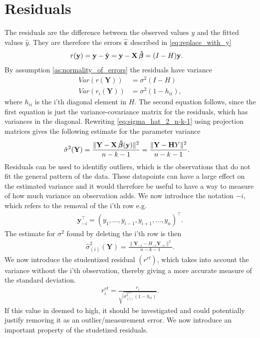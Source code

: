 \section{Residuals}\label{subsec:residuals}

The residuals are the difference between the observed values $y$ and the fitted values $\hat{y}$. They are therefore the errors $\boldsymbol{\hat{\varepsilon}}$ described in \eqref{eq:replace_with_y}
\begin{align*}
    r(\textbf{y}) &= \textbf{y} - \hat{\textbf{y}} = \textbf{y} - \textbf{X} \operatorname{\boldsymbol{\hat{\beta}}} = (I - H) \textbf{y}.
\end{align*}
By assumption \ref{as:normality_of_errors} the residuals have variance
\begin{align*}
    Var(r(\textbf{Y})) &= \sigma^2 (I - H) \\
    Var(r_i(\textbf{Y})) &= \sigma^2(1 - h_{ii}),
\end{align*}
where $h_{ii}$ is the i'th diagonal element in $H$. The second equation follows, since the first equation is just the variance-covariance matrix for the residuals, which has variances in the diagonal.
Rewriting \eqref{eq:sigma_hat_2_n-k-1} using projection matrices gives the following estimate for the parameter variance
\begin{align*}
    \hat{\sigma}^2(\textbf{Y}) &= \frac{\| \textbf{Y} - \textbf{X} \operatorname{\boldsymbol{\hat{\beta}}} (\textbf{y}) \|^2 }{n-k-1} = \frac{\| \textbf{Y} - \textbf{H} Y \|^2}{n-k-1} .
\end{align*}
Residuals can be used to identifiy outliers, which is the observations that do not fit the general pattern of the data.
These datapoints can have a large effect on the estimated variance and it would therefore be useful to have a way to measure of how much variance an observation adds.
We now introduce the notation $-i$, which refers to the removal of the i'th row e.g.
\begin{align*}
    \textbf{y}_{-i}^\top = (y_1, \ldots, y_{i-1}, y_{i+1}, \ldots, y_n)^\top.
\end{align*}
The estimate for $\sigma^2$ found by deleting the i'th row is then
\begin{align*}
    \hat{\sigma}^2_{(i)}(\textbf{Y}) = \frac{\| \textbf{Y}_{-i} - H_{-i} \textbf{Y}_{-i} \|^2}{n-k-1}.
\end{align*}
We now introduce the studentized residual $(r^{rt})$, which takes into account the variance without the i'th observation, thereby giving a more accurate measure of the standard deviation. 
\begin{align*}
    r_i^{rt} = \frac{r_i}{\sqrt{\hat{\sigma^2_{(i)}}(1-h_{ii})}}.
\end{align*}
If this value in deemed to high, it should be investigated and could potentially justify removing it as an outlier/measurement error. We now introduce an important property of the studetized residuals.


